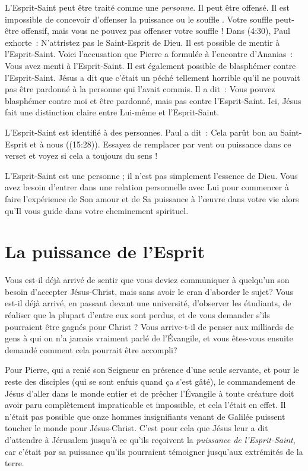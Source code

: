 L'Esprit-Saint peut être traité comme une \emph{personne}. Il peut être offensé.
 Il est impossible de concevoir d'offenser \og la puissance \fg{} ou
 \og le souffle \fg{}. Votre souffle peut-être offensif, mais vous ne pouvez
 pas offenser votre souffle ! Dans (4:30), Paul exhorte~:
 \og N'attristez pas le Saint-Esprit de Dieu. \fg{}
 Il est possible de mentir à l'Esprit-Saint. Voici l'accusation que Pierre a
 formulée à l'encontre d'Ananias~:
 \og Vous avez menti à l'Esprit-Saint. \fg{}
 Il est également possible de blasphémer contre l'Esprit-Saint.
 Jésus a dit que c'était un péché tellement horrible qu'il ne pouvait pas
 être pardonné à la personne qui l'avait commis. Il a dit~:
 \og Vous pouvez blasphémer contre moi et être pardonné, mais pas contre
 l'Esprit-Saint. \fg{}
 Ici, Jésus fait une distinction claire entre Lui-même et l'Esprit-Saint.

L'Esprit-Saint est identifié à des personnes. Paul a dit~:
 \og Cela parût bon au Saint-Esprit et à nous \fg{}
 ((15:28)).
 Essayez de remplacer par vent ou puissance dans ce verset et voyez si cela
 a toujours du sens !

L'Esprit-Saint est une personne ; il n'est pas simplement l'essence de Dieu.
 Vous avez besoin d'entrer dans une relation personnelle avec Lui pour
 commencer à faire l'expérience de Son amour et de Sa puissance à l'œuvre
 dans votre vie alors qu'Il vous guide dans votre cheminement spirituel.


\section*{La puissance de l'Esprit}

Vous est-il déjà arrivé de sentir que vous deviez communiquer à quelqu'un
son besoin d'accepter Jésus-Christ, mais sans avoir le cran d'aborder le sujet?
 Vous est-il déjà arrivé, en passant devant une université,
 d'observer les étudiants, de réaliser que la plupart d'entre eux sont perdus,
 et de vous demander s'ils pourraient être gagnés pour Christ ?
 Vous arrive-t-il de penser aux milliards de gens à qui on n'a jamais vraiment
 parlé de l'Évangile, et vous êtes-vous ensuite demandé comment cela pourrait
 être accompli?

Pour Pierre, qui a renié son Seigneur en présence d'une seule servante,
 et pour le reste des disciples (qui se sont enfuis quand ça s'est gâté),
 le commandement de Jésus d'aller dans le monde entier et de prêcher
 l'Évangile à toute créature doit avoir paru complètement impraticable et
 impossible, et cela l'était en effet.
 Il n'était pas possible que onze hommes insignifiants venant de Galilée
 puissent toucher le monde pour Jésus-Christ.
 C'est pour cela que Jésus leur a dit d'attendre à Jérusalem jusqu'à ce
 qu'ils reçoivent la \emph{puissance de l'Esprit-Saint}, car c'était par
 sa puissance qu'ils pourraient témoigner jusqu'aux extrémités de la terre.

